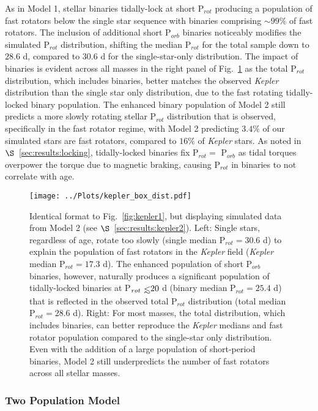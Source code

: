 \documentclass[twocolumn]{aastex61}
\def\lsim{~\rlap{$<$}{\lower 1.0ex\hbox{$\sim$}}}
\begin{document}
As in Model 1, stellar binaries tidally-lock at short P$_{rot}$ producing a population of fast rotators below the single star sequence with binaries comprising ${\sim}99\%$ of fast rotators.  The inclusion of additional short P$_{orb}$ binaries noticeably modifies the simulated P$_{rot}$ distribution, shifting the median P$_{rot}$ for the total sample down to $28.6$ d, compared to $30.6$ d for the single-star-only distribution.  The impact of binaries is evident across all masses in the right panel of Fig.~\ref{fig:kepler2} as the total P$_{rot}$ distribution, which includes binaries, better matches the observed \textit{Kepler} distribution than the single star only distribution, due to the fast rotating tidally-locked binary population.  The enhanced binary population of Model 2 still predicts a more slowly rotating stellar P$_{rot}$ distribution that is observed, specifically in the fast rotator regime, with Model 2 predicting $3.4\%$ of our simulated stars are fast rotators, compared to $16\%$ of \textit{Kepler} stars. As noted in $\S$~\ref{sec:results:locking}, tidally-locked binaries fix P$_{rot} = $ P$_{orb}$ as tidal torques overpower the torque due to magnetic braking, causing P$_{rot}$ in binaries to not correlate with age.

\begin{figure*}[ht]
	\texttt{[image: ../Plots/kepler\_box\_dist.pdf]}
   \caption{Identical format to Fig.~\ref{fig:kepler1}, but displaying simulated data from Model 2 (see $\S$~\ref{sec:results:kepler2}). Left: Single stars, regardless of age, rotate too slowly (single median P$_{rot} = 30.6$ d) to explain the population of fast rotators in the \textit{Kepler} field (\textit{Kepler} median P$_{rot} = 17.3$ d).  The enhanced population of short P$_{orb}$ binaries, however, naturally produces a significant population of tidally-locked binaries at P$_{rot} \lsim 20$ d (binary median P$_{rot} = 25.4$ d) that is reflected in the observed total P$_{rot}$ distribution (total median P$_{rot} = 28.6$ d). Right: For most masses, the total distribution, which includes binaries, can better reproduce the \textit{Kepler} medians and fast rotator population compared to the single-star only distribution.  Even with the addition of a large population of short-period binaries, Model 2 still underpredicts the number of fast rotators across all stellar masses.}%
    \label{fig:kepler2}%
\end{figure*}

\subsubsection{Two Population Model} \label{sec:results:kepler_two_pop}
\end{document}
